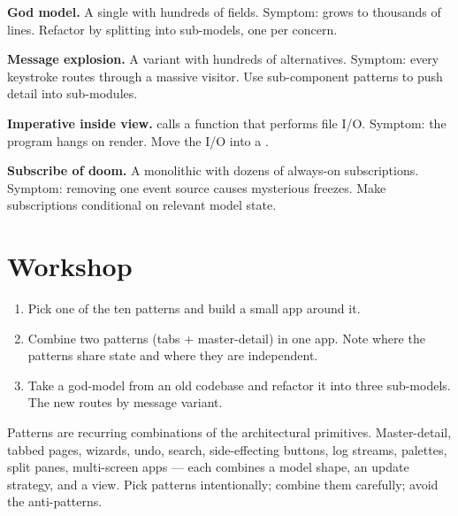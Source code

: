 \begin{warning}
\textbf{God model.} A single  with hundreds of
fields. Symptom:  grows to thousands of lines.
Refactor by splitting into sub-models, one per concern.
\end{warning}

\begin{warning}
\textbf{Message explosion.} A  variant with hundreds
of alternatives. Symptom: every keystroke routes through a
massive visitor. Use sub-component patterns to push detail into
sub-modules.
\end{warning}

\begin{warning}
\textbf{Imperative inside view.}  calls a function
that performs file I/O. Symptom: the program hangs on render.
Move the I/O into a .
\end{warning}

\begin{warning}
\textbf{Subscribe of doom.} A monolithic  with
dozens of always-on subscriptions. Symptom: removing one event
source causes mysterious freezes. Make subscriptions conditional
on relevant model state.
\end{warning}

\section*{Workshop}

\begin{enumerate}[leftmargin=*]
  \item Pick one of the ten patterns and build a small app
    around it.
  \item Combine two patterns (tabs + master-detail) in one
    app. Note where the patterns share state and where they
    are independent.
  \item Take a god-model from an old codebase and refactor it
    into three sub-models. The new  routes by
    message variant.
\end{enumerate}

\begin{recap}
Patterns are recurring combinations of the architectural
primitives. Master-detail, tabbed pages, wizards, undo, search,
side-effecting buttons, log streams, palettes, split panes,
multi-screen apps --- each combines a model shape, an update
strategy, and a view. Pick patterns intentionally; combine them
carefully; avoid the anti-patterns.
\end{recap}
